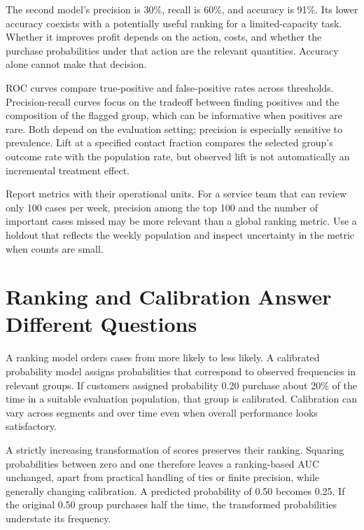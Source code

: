 The second model's precision is 30\%, recall is 60\%, and accuracy is
91\%. Its lower accuracy coexists with a potentially useful ranking for
a limited-capacity task. Whether it improves profit depends on the
action, costs, and whether the purchase probabilities under that action
are the relevant quantities. Accuracy alone cannot make that decision.

ROC curves compare true-positive and false-positive rates across
thresholds. Precision-recall curves focus on the tradeoff between
finding positives and the composition of the flagged group, which can be
informative when positives are rare. Both depend on the evaluation
setting; precision is especially sensitive to prevalence. Lift at a
specified contact fraction compares the selected group's outcome rate
with the population rate, but observed lift is not automatically an
incremental treatment effect.

Report metrics with their operational units. For a service team that can
review only 100 cases per week, precision among the top 100 and the
number of important cases missed may be more relevant than a global
ranking metric. Use a holdout that reflects the weekly population and
inspect uncertainty in the metric when counts are small.

\hypertarget{M07-ranking-and-calibration-answer-different-questions}{%
\section{Ranking and Calibration Answer Different
Questions}\label{M07-ranking-and-calibration-answer-different-questions}}

\noindent A ranking model orders cases from more likely to less likely. A
calibrated probability model assigns probabilities that correspond to
observed frequencies in relevant groups. If customers assigned
probability 0.20 purchase about 20\% of the time in a suitable
evaluation population, that group is calibrated. Calibration can vary
across segments and over time even when overall performance looks
satisfactory.

A strictly increasing transformation of scores preserves their ranking.
Squaring probabilities between zero and one therefore leaves a
ranking-based AUC unchanged, apart from practical handling of ties or
finite precision, while generally changing calibration. A predicted
probability of 0.50 becomes 0.25. If the original 0.50 group purchases
half the time, the transformed probabilities understate its frequency.

